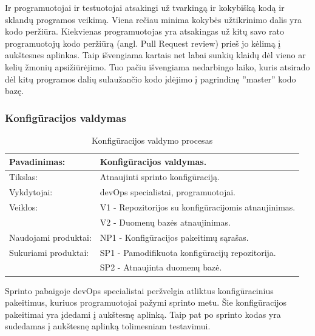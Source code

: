 \documentclass{VUMIFPSkursinis}
\begin{document}
	\par Ir programuotojai ir testuotojai atsakingi už tvarkingą ir kokybišką kodą ir sklandų programos veikimą. Viena rečiau minima kokybės užtikrinimo dalis yra kodo peržiūra. Kiekvienas programuotojas yra atsakingas už kitų savo rato programuotojų kodo peržiūrą (angl. Pull Request review) prieš jo kėlimą į aukštesnes aplinkas. Taip išvengiama kartais net labai sunkių klaidų dėl vieno ar kelių žmonių apsižiūrėjimo. Tuo pačiu išvengiama nedarbingo laiko, kuris atsirado dėl kitų programos dalių sulaužančio kodo įdėjimo į pagrindinę ''master'' kodo bazę.
	\newpage
	\subsubsection{Konfigūracijos valdymas}
	\begin{center}
		\begin{table}[ht]
		\caption{Konfigūracijos valdymo procesas}
		\begin{tabular}{ | l | l | } 
		\hline
		Pavadinimas:         & Konfigūracijos valdymas.                      \\ \hline
		Tikslas: 	           & Atnaujinti sprinto konfigūraciją.      \\ \hline
		Vykdytojai:          & devOps specialistai, programuotojai.                       \\ \hline
		Veiklos:             & V1 - Repozitorijos su konfigūracijomis atnaujinimas. 									  \\
						             & V2 - Duomenų bazės atnaujinimas. 							 \\ \hline
		Naudojami produktai: & NP1 - Konfigūracijos pakeitimų sąrašas.								 \\ \hline
		Sukuriami produktai: & SP1 - Pamodifikuota konfigūracijų repozitorija. 							  		\\
												 & SP2 - Atnaujinta duomenų bazė. 											 \\  \hline
		\end{tabular}
	\end{table}
		\end{center}
		Sprinto pabaigoje devOps specialistai peržvelgia atliktus konfigūracinius pakeitimus, kuriuos programuotojai pažymi sprinto metu. Šie konfigūracijos pakeitimai yra įdedami į aukštesnę aplinką. Taip pat po sprinto kodas yra sudedamas į aukštesnę aplinką tolimesniam testavimui.
\end{document}
